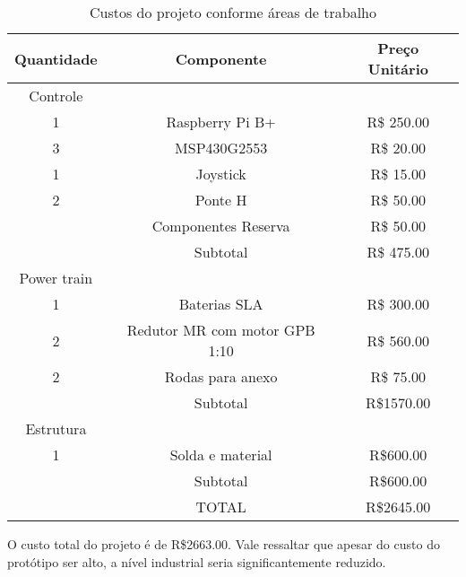 \begin{table}[!ht]
\centering
\begin{tabular}{ |c|c|c| }
 \hline
Quantidade & Componente & Preço Unitário\\
 \hline
Controle &  & \\
 1 & Raspberry Pi B+   &  R\$ 250.00 \\
 3 & MSP430G2553  & R\$ 20.00 \\
 1 & Joystick  & R\$ 15.00 \\
 2 & Ponte H &  R\$ 50.00 \\
  & Componentes Reserva & R\$ 50.00\\
& Subtotal & R\$ 475.00\\ \hline

Power train &  & \\
1 & Baterias SLA  & R\$ 300.00\\
2 & Redutor MR com motor GPB 1:10 &  R\$ 560.00\\
2 & Rodas para anexo & R\$ 75.00\\
& Subtotal &  R\$1570.00\\ \hline

Estrutura &  & \\
1 &  Solda e material & R\$600.00\\
 & Subtotal & R\$600.00 \\ \hline

& TOTAL &  R\$2645.00\\ \hline
\end{tabular}
\caption{Custos do projeto conforme áreas de trabalho}
\label{tab:custos_tabela}
\end{table}

O custo total do projeto é de R\$2663.00.  Vale ressaltar que apesar do custo do protótipo ser alto, a nível industrial seria significantemente reduzido.
